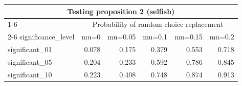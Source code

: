 \begin{table}[t]
\fontsize{12.0pt}{14.4pt}\selectfont
\begin{tabular*}{\linewidth}{@{\extracolsep{\fill}}lrrrrr}
\toprule
\multicolumn{6}{c}{Testing proposition 2 (selfish)} \\ 
\cmidrule(lr){1-6}
 & \multicolumn{5}{c}{Probability of random choice replacement} \\ 
\cmidrule(lr){2-6}
significance\_level & mu=0 & mu=0.05 & mu=0.1 & mu=0.15 & mu=0.2 \\ 
\midrule\addlinespace[2.5pt]
significant\_01 & 0.078 & 0.175 & 0.379 & 0.553 & 0.718 \\ 
significant\_05 & 0.204 & 0.233 & 0.592 & 0.786 & 0.845 \\ 
significant\_10 & 0.223 & 0.408 & 0.748 & 0.874 & 0.913 \\ 
\bottomrule
\end{tabular*}
\end{table}

